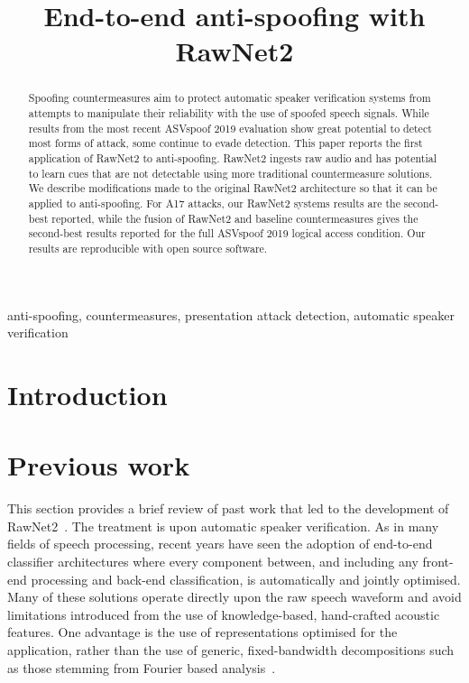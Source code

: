 \documentclass{article}
\title{End-to-end anti-spoofing with RawNet2}
\begin{document}
%
\maketitle
%
\begin{abstract}
Spoofing countermeasures aim to protect automatic speaker verification systems from attempts to manipulate their reliability with the use of spoofed speech signals. While results from the most recent ASVspoof 2019 evaluation show great potential to detect most forms of attack, some continue to evade detection. This paper reports the first application of RawNet2 to anti-spoofing. RawNet2 ingests raw audio and has potential to learn cues that are not detectable using more traditional countermeasure solutions. We describe modifications made to the original RawNet2 architecture so that it can be applied to anti-spoofing. For A17 attacks, our RawNet2 systems results are the second-best reported, while the fusion of RawNet2 and baseline countermeasures gives the second-best results reported for the full ASVspoof 2019 logical access condition. Our results are reproducible with open source software. 
\end{abstract}
%

\begin{keywords}
anti-spoofing, countermeasures, presentation attack detection, automatic speaker verification
\end{keywords}
%

\section{Introduction}



\label{sec:intro}

\section{Previous work}

This section provides a brief review of past work that led to the development of RawNet2~\cite{jung2020improved}. The treatment is upon automatic speaker verification. 
As in many fields of speech processing, recent years have seen the adoption of end-to-end classifier architectures where every component between, and including any front-end processing and back-end classification, is automatically and jointly optimised. Many of these solutions operate directly upon the raw speech waveform and avoid limitations introduced from the use of knowledge-based, hand-crafted acoustic features. One advantage is the use of representations optimised for the application, rather than the use of generic, fixed-bandwidth decompositions such as those stemming from Fourier based analysis~\cite{muckenhirn2018towards}.
\end{document}
